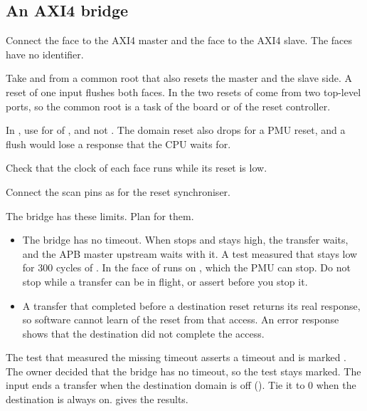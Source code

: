\subsection{An AXI4 bridge}
\begin{procedure}
  \item Connect the  face to the AXI4 master and the  face to the AXI4 slave. The faces have no identifier.
  \item Take  and  from a common root that also resets the master and the slave side. A reset of one input flushes both faces. In  the two resets of  come from two top-level ports, so the common root is a task of the board or of the reset controller.
  \item In , use  for  of , and not . The domain reset also drops for a PMU reset, and a flush would lose a response that the CPU waits for.
  \item Check that the clock of each face runs while its reset is low.
  \item Connect the scan pins as for the reset synchroniser.
\end{procedure}
\begin{warningbox}
The bridge  has these limits. Plan for them.
\begin{itemize}
  \item The bridge has no timeout. When  stops and  stays high, the transfer waits, and the APB master upstream waits with it. A test measured that  stays low for 300 cycles of . In  the  face of  runs on , which the PMU can stop. Do not stop  while a transfer can be in flight, or assert  before you stop it.
  \item A transfer that completed before a destination reset returns its real response, so software cannot learn of the reset from that access. An error response shows that the destination did not complete the access.
\end{itemize}
The test that measured the missing timeout asserts a timeout and is marked . The owner decided that the bridge has no timeout, so the test stays marked. The input  ends a transfer when the destination domain is off (). Tie it to 0 when the destination is always on.  gives the results.
\end{warningbox}
